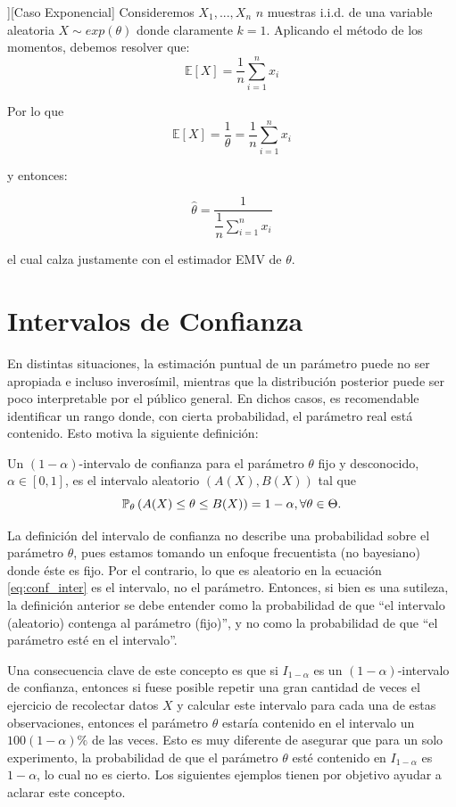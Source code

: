 \begin{example}][Caso Exponencial]
Consideremos $X_1,...,X_n$ $n$ muestras i.i.d. de una variable aleatoria $X\sim exp(\theta)$ donde claramente $k=1$. Aplicando el método de los momentos, debemos resolver que:
\[\mathbb{E}[X]=\dfrac{1}{n}\sum\limits_{i=1}^{n}x_i\]

Por lo que 
\[\mathbb{E}[X]=\dfrac{1}{\theta}=\dfrac{1}{n}\sum\limits_{i=1}^{n}x_i\]

y entonces:

\[\hat{\theta}=\dfrac{1}{\dfrac{1}{n}\sum\limits_{i=1}^{n}x_i}\]

el cual calza justamente con el estimador EMV de $\theta$. 
\end{example}


\section{Intervalos de Confianza} 

En distintas situaciones, la estimación puntual de un parámetro puede no ser apropiada e incluso inverosímil, mientras que la distribución posterior puede ser poco interpretable por el público general. En dichos casos, es recomendable identificar un rango donde, con cierta probabilidad, el parámetro real está contenido. Esto motiva la siguiente definición: 

\begin{definition}
\label{def:conf_inter} Un $(1-\alpha)$-intervalo de confianza para el parámetro $\theta$ fijo y desconocido, $\alpha\in[0,1]$, es el intervalo aleatorio $(A(X),B(X))$ tal que 
\begin{equation}
	\label{eq:conf_inter}
	\mathbb{P}_\theta \left(A(X)\leq\theta\leq B(X)\right) = 1-\alpha, \forall \theta\in\Theta.
\end{equation}
\end{definition}

\begin{remark}
	La definición del intervalo de confianza no describe una probabilidad sobre el parámetro $\theta$, pues estamos tomando un enfoque frecuentista (no bayesiano) donde éste es fijo. Por el contrario, lo que es aleatorio en la ecuación \eqref{eq:conf_inter} es el intervalo, no el parámetro. Entonces, si bien es una sutileza, la definición anterior se debe entender como la probabilidad de que ``el intervalo (aleatorio) contenga al parámetro (fijo)'', y no como la probabilidad de que ``el parámetro esté en el intervalo''. 
\end{remark}
Una consecuencia clave de este concepto es que si $I_{1-\alpha}$ es un $(1-\alpha)$-intervalo de confianza, entonces si fuese posible repetir una gran cantidad de veces el ejercicio de recolectar datos $X$ y calcular este intervalo para cada una de estas observaciones, entonces el parámetro $\theta$ estaría contenido en el intervalo un $100(1-\alpha)\%$ de las veces. Esto es muy diferente de asegurar que para un solo experimento, la probabilidad de que el parámetro $\theta$ esté contenido en $I_{1-\alpha}$ es $1-\alpha$, lo cual no es cierto. Los siguientes ejemplos tienen por objetivo ayudar a aclarar este concepto.

